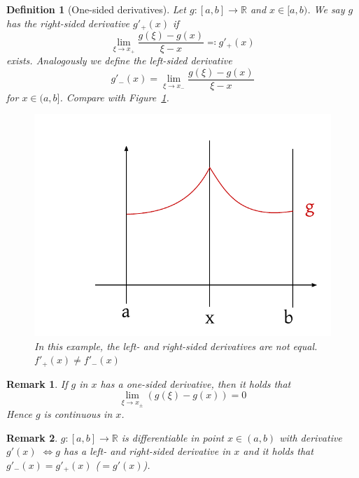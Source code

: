 \documentclass{article}
\newtheorem{definition}{Definition}  \numberwithin{definition}{section}
\newtheorem{remark}{Remark}  \numberwithin{remark}{section}
\begin{document}
\begin{definition}[One-sided derivatives] %
  Let $g: [a,b] \to \mathbb R$ and $x \in [a,b)$.
  We say $g$ has the \emph{right-sided derivative} $g'_+(x)$ if
  \[ \lim_{\xi \to x_+} \frac{g(\xi) - g(x)}{\xi - x} \eqqcolon g'_+(x) \]
  exists. Analogously we define the left-sided derivative
  \[ g'_-(x) = \lim_{\xi \to x_-} \frac{g(\xi) - g(x)}{\xi - x} \]
  for $x \in (a,b]$. Compare with Figure~\ref{img:lrderiv}.

  \begin{figure}[!h]
    \begin{center}
      \includegraphics{img/19_left_right_sided_derivative.pdf}
      \caption{In this example, the left- and right-sided derivatives are not equal. $f'_+(x) \neq f'_-(x)$}
      \label{img:lrderiv}
    \end{center}
  \end{figure}
\end{definition}

\begin{remark}
  If $g$ in $x$ has a one-sided derivative, then it holds that
  \[ \lim_{\xi \to x_\pm} (g(\xi) - g(x)) = 0 \]
  Hence $g$ is continuous in $x$.
\end{remark}

\begin{remark}
  $g: [a,b] \to \mathbb R$ is differentiable in point $x \in (a,b)$ with derivative $g'(x)$
  $\iff g$ has a left- and right-sided derivative in $x$ and it holds that $g'_-(x) = g'_+(x)$ ($= g'(x)$).
\end{remark}
\end{document}
